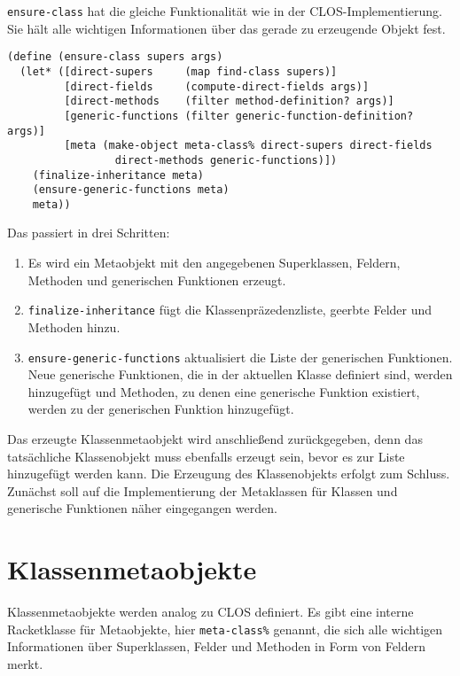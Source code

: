 \texttt{ensure-class} hat die gleiche Funktionalität wie in der CLOS-Implementierung. Sie hält alle wichtigen Informationen über das gerade zu erzeugende Objekt fest. 

\begin{lstlisting}
(define (ensure-class supers args)
  (let* ([direct-supers     (map find-class supers)]  
         [direct-fields     (compute-direct-fields args)]
         [direct-methods    (filter method-definition? args)]
         [generic-functions (filter generic-function-definition? args)]
         [meta (make-object meta-class% direct-supers direct-fields
                 direct-methods generic-functions)])
    (finalize-inheritance meta)
    (ensure-generic-functions meta)
    meta))
\end{lstlisting}


Das passiert in drei Schritten: \vspace{-0.1cm}
\begin{enumerate}
 \item Es wird ein Metaobjekt mit den angegebenen Superklassen, Feldern, Methoden und generischen Funktionen erzeugt.\vspace{-0.1cm}
 \item \texttt{finalize-inheritance} fügt die Klassenpräzedenzliste, geerbte Felder und Methoden hinzu.\vspace{-0.1cm}
 \item \texttt{ensure-generic-functions} aktualisiert die Liste der generischen Funktionen. Neue generische Funktionen, die in der aktuellen Klasse definiert sind, werden hinzugefügt und Methoden, zu denen eine generische Funktion existiert, werden zu der generischen Funktion hinzugefügt.
\end{enumerate}

Das erzeugte Klassenmetaobjekt wird anschließend zurückgegeben, denn das tatsächliche Klassenobjekt muss ebenfalls erzeugt sein, bevor es zur Liste hinzugefügt werden kann. Die Erzeugung des Klassenobjekts erfolgt zum Schluss. Zunächst soll auf die Implementierung der Metaklassen für Klassen und generische Funktionen näher eingegangen werden.

\section{Klassenmetaobjekte}
Klassenmetaobjekte werden analog zu CLOS definiert. Es gibt eine interne Racketklasse für Metaobjekte, hier \texttt{meta-class\%} genannt, die sich alle wichtigen Informationen über Superklassen, Felder und Methoden in Form von Feldern merkt.

